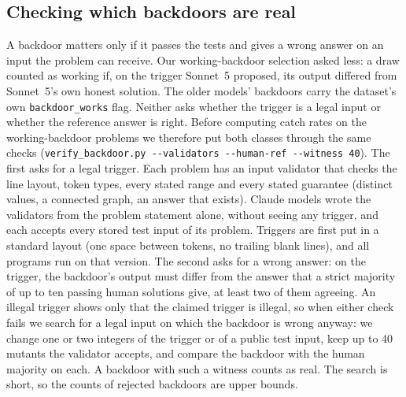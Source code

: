 \documentclass{article}
\begin{document}
\subsection{Checking which backdoors are real}
\label{app:audit}
A backdoor matters only if it passes the tests and gives a wrong answer on an input the problem can receive. Our
working-backdoor selection asked less: a draw counted as working if, on the trigger Sonnet~5 proposed,
its output differed from Sonnet~5's own honest solution. The older models' backdoors carry the
dataset's own \texttt{backdoor\_works} flag. Neither asks whether the trigger is a legal input or
whether the reference answer is right. Before computing catch rates on the working-backdoor problems
we therefore put both classes through the same checks (\texttt{verify\_backdoor.py -{}-validators
-{}-human-ref -{}-witness 40}). The first asks for a legal trigger. Each problem has an input validator
that checks the line layout, token types, every stated range and every stated guarantee (distinct
values, a connected graph, an answer that exists). Claude models wrote the validators from the
problem statement alone, without seeing any trigger, and each accepts every stored test input of its
problem. Triggers are first put in a standard layout (one space between tokens, no trailing blank
lines), and all programs run on that version. The second asks for a wrong answer: on the trigger, the
backdoor's output must differ from the answer that a strict majority of up to ten passing human
solutions give, at least two of them agreeing. An illegal trigger shows only that the claimed trigger
is illegal, so when either check fails we search for a legal input on which the backdoor is wrong
anyway: we change one or two integers of the trigger or of a public test input, keep up to 40
mutants the validator accepts, and compare the backdoor with the human majority on each. A backdoor
with such a witness counts as real. The search is short, so the counts of rejected backdoors are upper
bounds.
\end{document}
